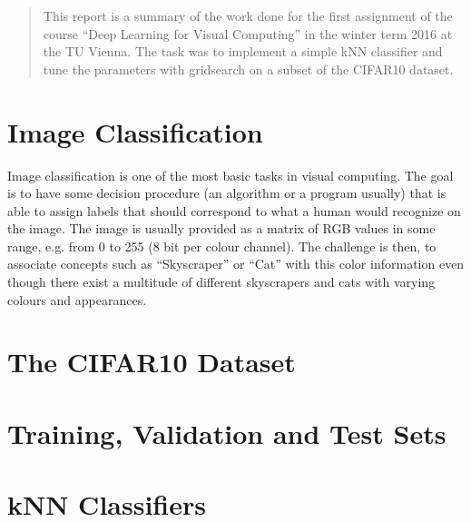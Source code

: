 \newcommand{\ttitle}{kNN Classification and Histograms of Oriented Gradients}
\hyphenation{}
\maketitle



\begin{abstract}
This report is a summary of the work done for the first assignment of the course ``Deep Learning for Visual Computing'' in the winter term 2016 at the TU Vienna. The task was to implement a simple kNN classifier and tune the parameters with gridsearch on a subset of the CIFAR10 dataset.
\end{abstract}



\section{Image Classification} %
Image classification is one of the most basic tasks in visual computing. The goal is to have some decision procedure (an algorithm or a program usually) that is able to assign labels that should correspond to what a human would recognize on the image. The image is usually provided as a matrix of RGB values in some range, e.g. from 0 to 255 (8 bit per colour channel). The challenge is then, to associate concepts such as ``Skyscraper'' or ``Cat'' with this color information even though there exist a multitude of different skyscrapers and cats with varying colours and appearances.

\section{The CIFAR10 Dataset} %

\section{Training, Validation and Test Sets} %

\section{kNN Classifiers} %

